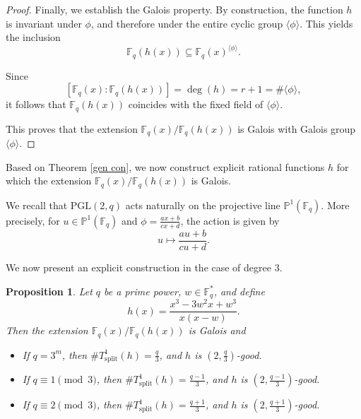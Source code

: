 \documentclass[1p,final]{elsarticle}
\newtheorem{proposition}[theorem]{Proposition}
\newtheorem{open problem}[theorem]{Open Problem}
\begin{document}
\begin{proof}
Finally, we establish the Galois property. By construction, the function $h$ is invariant under $\phi$, and therefore under the entire cyclic group $\langle \phi \rangle$. This yields the inclusion
\[
\mathbb{F}_q(h(x)) \subseteq \mathbb{F}_q(x)^{\langle \phi \rangle}.
\]

Since
\[
[\mathbb{F}_q(x):\mathbb{F}_q(h(x))]=\deg(h)=r+1=\#\langle \phi \rangle,
\]
it follows that $\mathbb{F}_q(h(x))$ coincides with the fixed field of $\langle \phi \rangle$.

\medskip

This proves that the extension $\mathbb{F}_q(x)/\mathbb{F}_q(h(x))$ is Galois with Galois group $\langle \phi \rangle$.

\end{proof}





Based on Theorem \ref{gen con}, we now construct explicit rational functions $h$ for which the extension $\mathbb{F}_{q}(x)/\mathbb{F}_{q}(h(x))$ is Galois.

\medskip

We recall that $\mathrm{PGL}(2, q)$ acts naturally on the projective line $\mathbb{P}^{1}(\mathbb{F}_{q})$. More precisely, for $u\in \mathbb{P}^{1}(\mathbb{F}_{q})$ and $\phi=\displaystyle\frac{ax+b}{cx+d}$, the action is given by
\[
u \longmapsto \frac{au+b}{cu+d}.
\]

\medskip

We now present an explicit construction in the case of degree $3$.

\begin{proposition}\label{gal 1}
Let $q$ be a prime power, $w\in\mathbb{F}_{q}^{*}$, and define
\[
h(x)=\displaystyle\frac{x^3-3w^2x+w^3}{x(x-w)}.
\]
Then the extension $\mathbb{F}_{q}(x)/\mathbb{F}_{q}(h(x))$ is Galois and 
\begin{itemize}
\item[(i)] If $q=3^m$, then $\# T_{\text{split}}^1(h) =\displaystyle\frac{q}{3}$, and $h$ is $(2, \displaystyle\frac{q}{3})$-good.

\item[(ii)] If $q\equiv 1 \pmod{3}$, then $\# T_{\text{split}}^1(h) =\displaystyle\frac{q-1}{3}$, and $h$ is $(2, \displaystyle\frac{q-1}{3})$-good.

\item[(iii)] If $q\equiv 2 \pmod{3}$, then $\# T_{\text{split}}^1(h) =\displaystyle\frac{q+1}{3}$, and $h$ is $(2, \displaystyle\frac{q+1}{3})$-good.
\end{itemize}
\end{proposition}
\end{document}
